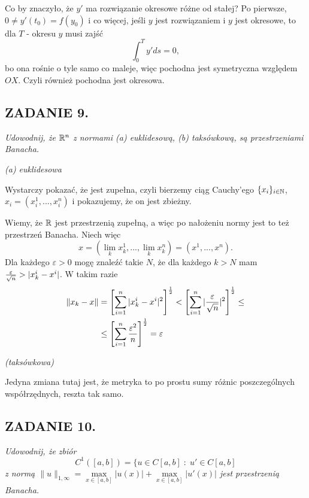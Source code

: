 \documentclass{article}
\begin{document}

Co by znaczyło, że $y'$ ma rozwiązanie okresowe różne od stałej? Po pierwsze, $0\neq y'(t_0)=f(y_0)$ i co więcej, jeśli $y$ jest rozwiązaniem i $y$ jest okresowe, to dla $T$ - okresu $y$ musi zajść
$$\int_0^Ty'ds=0,$$
bo ona rośnie o tyle samo co maleje, więc pochodna jest symetryczna względem $OX$. Czyli również pochodna jest okresowa.

\subsection*{ZADANIE 9.}
\emph{\color{pink}Udowodnij, że $\mathbb{R}^n$ z normami (a) euklidesową, (b) taksówkową, są przestrzeniami Banacha.}

\emph{\color{pink}(a) euklidesowa}

Wystarczy pokazać, że jest zupełna, czyli bierzemy ciąg Cauchy'ego $\{x_i\}_{i\in\mathbb{N}}$, $x_i=(x_i^1,...,x_i^n)$ i pokazujemy, że on jest zbieżny. 

Wiemy, że $\mathbb{R}$ jest przestrzenią zupełną, a więc po nałożeniu normy jest to też przestrzeń Banacha. Niech więc 
$$x=(\lim_k x_k^1,...,\lim_kx_k^n)=(x^1,...,x^n).$$
Dla każdego $\varepsilon>0$ mogę znaleźć takie $N$, że dla każdego $k>N$ mam ${\varepsilon\over \sqrt{n}}>|x_k^i-x^i|$. W takim razie
\begin{align*}
    \|x_k-x\|&=\left[\sum\limits_{i=1}^n|x_k^i-x^i|^2\right]^\frac12<\left[\sum\limits_{i=1}^n|{\varepsilon\over \sqrt{n}}|^2\right]^\frac12\leq\\
    &\leq \left[\sum\limits_{i=1}^n{\varepsilon^2\over n}\right]^\frac12=\varepsilon
\end{align*}

\emph{\color{pink}(taksówkowa)}

Jedyna zmiana tutaj jest, że metryka to po prostu sumy różnic poszczególnych współrzędnych, reszta tak samo.

\subsection*{ZADANIE 10.}
{\color{pink}\emph{Udowodnij, że zbiór}
$$C^1([a, b])=\{u\in C[a, b]\;:\;u'\in C[a, b]$$
\emph{z normą $\|u\|_{1,\infty}=\max\limits_{x\in [a, b]}|u(x)|+\max\limits_{x\in[a,b]}|u'(x)|$ jest przestrzenią Banacha. }}
\end{document}
